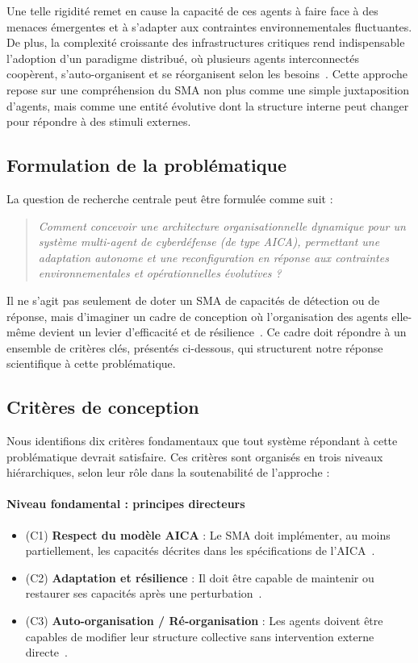 \documentclass[ twoside,openright,titlepage,numbers=noenddot,headinclude,%
                footinclude=true,cleardoublepage=empty,abstractoff, %
                BCOR=5mm,paper=a4,fontsize=11pt,%
                french,american,%
                ]{scrreprt}
\begin{document}
Une telle rigidité remet en cause la capacité de ces agents à faire face à des menaces émergentes et à s'adapter aux contraintes environnementales fluctuantes. De plus, la complexité croissante des infrastructures critiques rend indispensable l'adoption d'un paradigme distribué, où plusieurs agents interconnectés coopèrent, s'auto-organisent et se réorganisent selon les besoins~\cite{Ferber1999, Gleizes2008}. Cette approche repose sur une compréhension du SMA non plus comme une simple juxtaposition d'agents, mais comme une entité évolutive dont la structure interne peut changer pour répondre à des stimuli externes.

\subsection*{Formulation de la problématique}

La question de recherche centrale peut être formulée comme suit :

\begin{quote}
\emph{Comment concevoir une architecture organisationnelle dynamique pour un système multi-agent de cyberdéfense (de type AICA), permettant une adaptation autonome et une reconfiguration en réponse aux contraintes environnementales et opérationnelles évolutives ?}
\end{quote}

Il ne s'agit pas seulement de doter un SMA de capacités de détection ou de réponse, mais d'imaginer un cadre de conception où l'organisation des agents elle-même devient un levier d'efficacité et de résilience~\cite{Picard2003, DiMarzoSerugendo2005}. Ce cadre doit répondre à un ensemble de critères clés, présentés ci-dessous, qui structurent notre réponse scientifique à cette problématique.

\subsection*{Critères de conception}

Nous identifions dix critères fondamentaux que tout système répondant à cette problématique devrait satisfaire. Ces critères sont organisés en trois niveaux hiérarchiques, selon leur rôle dans la soutenabilité de l'approche :

\paragraph{Niveau fondamental : principes directeurs}
\begin{itemize}
    \item (C1) \textbf{Respect du modèle AICA} : Le SMA doit implémenter, au moins partiellement, les capacités décrites dans les spécifications de l'AICA~\cite{AICAGuide2022}.
    \item (C2) \textbf{Adaptation et résilience} : Il doit être capable de maintenir ou restaurer ses capacités après une perturbation~\cite{Bodeau2011}.
    \item (C3) \textbf{Auto-organisation / Ré-organisation} : Les agents doivent être capables de modifier leur structure collective sans intervention externe directe~\cite{DiMarzoSerugendo2005}.
\end{itemize}
\end{document}
